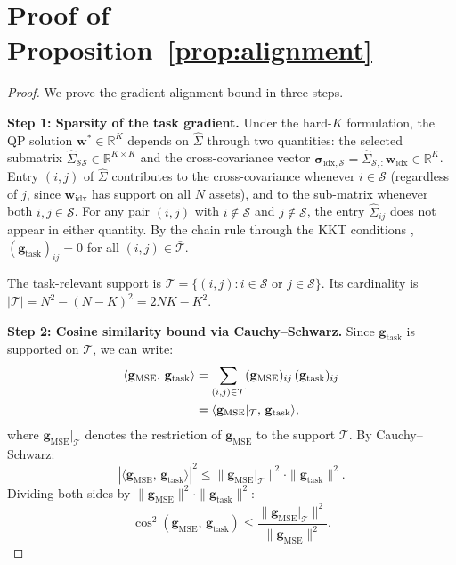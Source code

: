 \documentclass[letterpaper]{article}
\newcommand{\bw}{\mathbf{w}}
\newcommand{\bSigma}{\hat{\Sigma}}
\newcommand{\bsigma}{\boldsymbol{\sigma}}
\newcommand{\cS}{\mathcal{S}}
\begin{document}


\appendix
\section{Proof of Proposition~\ref{prop:alignment}}
\label{app:proof}

\begin{proof}
We prove the gradient alignment bound in three steps.

\textbf{Step 1: Sparsity of the task gradient.}
Under the hard-$K$ formulation, the QP solution $\bw^* \in \mathbb{R}^K$ depends on $\bSigma$ through two quantities: the selected submatrix $\bSigma_{\cS\cS} \in \mathbb{R}^{K \times K}$ and the cross-covariance vector $\hat{\bsigma}_{\text{idx},\cS} = \bSigma_{\cS,:}\bw_{\text{idx}} \in \mathbb{R}^K$. Entry $(i,j)$ of $\bSigma$ contributes to the cross-covariance whenever $i \in \cS$ (regardless of $j$, since $\bw_{\text{idx}}$ has support on all $N$ assets), and to the sub-matrix whenever both $i,j \in \cS$. For any pair $(i,j)$ with $i \notin \cS$ and $j \notin \cS$, the entry $\bSigma_{ij}$ does not appear in either quantity. By the chain rule through the KKT conditions \citep{amos2017optnet}, $(\mathbf{g}_{\mathrm{task}})_{ij} = 0$ for all $(i,j) \in \bar{\mathcal{T}}$.

The task-relevant support is $\mathcal{T} = \{(i,j) : i \in \cS \text{ or } j \in \cS\}$. Its cardinality is $|\mathcal{T}| = N^2 - (N-K)^2 = 2NK - K^2$.

\textbf{Step 2: Cosine similarity bound via Cauchy--Schwarz.}
Since $\mathbf{g}_{\mathrm{task}}$ is supported on $\mathcal{T}$, we can write:
\begin{align}
\langle \mathbf{g}_{\mathrm{MSE}},\, \mathbf{g}_{\mathrm{task}} \rangle
&= \sum_{(i,j) \in \mathcal{T}} (\mathbf{g}_{\mathrm{MSE}})_{ij}\, (\mathbf{g}_{\mathrm{task}})_{ij} \notag \\
&= \langle \mathbf{g}_{\mathrm{MSE}}|_{\mathcal{T}},\, \mathbf{g}_{\mathrm{task}} \rangle,
\end{align}
where $\mathbf{g}_{\mathrm{MSE}}|_{\mathcal{T}}$ denotes the restriction of $\mathbf{g}_{\mathrm{MSE}}$ to the support $\mathcal{T}$. By Cauchy--Schwarz:
\begin{equation}
|\langle \mathbf{g}_{\mathrm{MSE}},\, \mathbf{g}_{\mathrm{task}} \rangle|^2 \leq \|\mathbf{g}_{\mathrm{MSE}}|_{\mathcal{T}}\|^2 \cdot \|\mathbf{g}_{\mathrm{task}}\|^2.
\end{equation}
Dividing both sides by $\|\mathbf{g}_{\mathrm{MSE}}\|^2 \cdot \|\mathbf{g}_{\mathrm{task}}\|^2$:
\begin{equation}
\cos^2(\mathbf{g}_{\mathrm{MSE}},\, \mathbf{g}_{\mathrm{task}}) \leq \frac{\|\mathbf{g}_{\mathrm{MSE}}|_{\mathcal{T}}\|^2}{\|\mathbf{g}_{\mathrm{MSE}}\|^2}.
\end{equation}


\end{proof}
\end{document}
